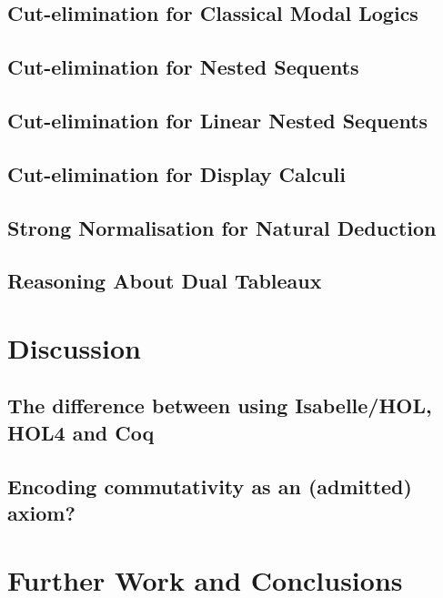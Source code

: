 \documentclass[a4paper]{article}
\begin{document}
\subsection{Cut-elimination for Classical Modal Logics}

\subsection{Cut-elimination for Nested Sequents}

\subsection{Cut-elimination for Linear Nested Sequents}

\subsection{Cut-elimination for Display Calculi}

\subsection{Strong Normalisation for Natural Deduction}

\subsection{Reasoning About Dual Tableaux}

\section{Discussion}

\subsection{The difference between using Isabelle/HOL, HOL4 and Coq}

\subsection{Encoding commutativity as an (admitted) axiom?}

\section{Further Work and Conclusions}
\end{document}
